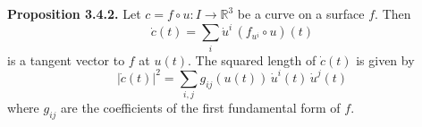 \textbf{Proposition 3.4.2.} Let $c = f \circ u: I \to \mathbb{R}^3$ be a curve on a surface $f$. Then
$$\dot{c}(t) = \sum_i \dot{u}^i \, (f_{u^i} \circ u)(t)$$
is a tangent vector to $f$ at $u(t)$. The squared length of $\dot{c}(t)$ is given by
$$|\dot{c}(t)|^2 = \sum_{i,j} g_{ij}(u(t)) \, \dot{u}^i(t) \, \dot{u}^j(t)$$
where $g_{ij}$ are the coefficients of the first fundamental form of $f$.
